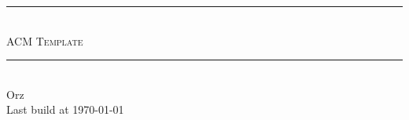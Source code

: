 \documentclass[10pt,a4paper ]{article}
\begin{document}
\begin{CJK}{UTF8}{gbsn}

    \begin{titlepage}
        \begin{center}
        \hrule\ \\[5pt]
        \Huge \textsc{ACM Template}\\[8pt]
        \hrule\ \\[300pt]

        \huge Orz\\[8pt]
        \Large Last build at \today \\[210pt]
        \end{center}
    \end{titlepage}


    \tableofcontents
    \clearpage

    
    \clearpage

    
    \clearpage

    
    \clearpage

    
    \clearpage

    
    \clearpage

    
    \clearpage

    
    \clearpage

    
    \clearpage

\end{CJK}
\end{document}
